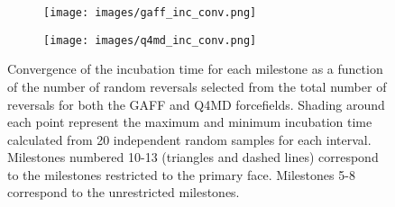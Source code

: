 \begin{figure}
\begin{subfigure}{0.8\linewidth}
	\texttt{[image: images/gaff\_inc\_conv.png]}
	\end{subfigure}
\begin{subfigure}{0.8\linewidth}
	\texttt{[image: images/q4md\_inc\_conv.png]}
	\end{subfigure}

	\caption{Convergence of the incubation time for each milestone as a function of the number of random reversals selected from the total number of reversals for both the GAFF and Q4MD forcefields. Shading around each point represent the maximum and minimum incubation time calculated from 20 independent random samples for each interval. Milestones numbered 10-13 (triangles and dashed lines) correspond to the milestones restricted to the primary face. Milestones 5-8 correspond to the unrestricted milestones.}
	\label{fig:inc_conv}
	\end{figure}